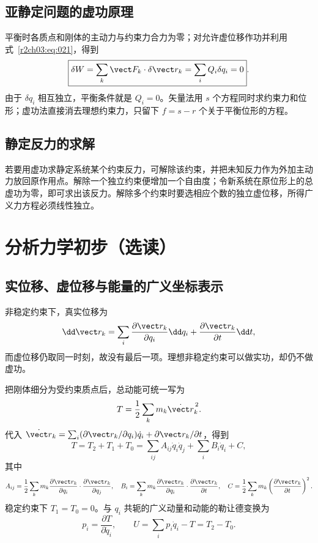 \subsection{亚静定问题的虚功原理}

平衡时各质点和刚体的主动力与约束力合力为零；对允许虚位移作功并利用式~\eqref{r2ch03:eq:021}，得到
\begin{equation}
 \boxed{\delta W=\sum_k\vect F_k\cdot\delta\vect r_k
 =\sum_iQ_i\delta q_i=0}.
 \label{r2ch03:eq:022}
\end{equation}
由于 $\delta q_i$ 相互独立，平衡条件就是 $Q_i=0$。矢量法用 $s$ 个方程同时求约束力和位形；虚功法直接消去理想约束力，只留下 $f=s-r$ 个关于平衡位形的方程。

\subsection{静定反力的求解}

若要用虚功求静定系统某个约束反力，可解除该约束，并把未知反力作为外加主动力放回原作用点。解除一个独立约束便增加一个自由度；令新系统在原位形上的总虚功为零，即可求出该反力。解除多个约束时要选相应个数的独立虚位移，所得广义力方程必须线性独立。

\section{分析力学初步（选读）}
\label{r2ch03:sec:lagrange}

\subsection{实位移、虚位移与能量的广义坐标表示}

非稳定约束下，真实位移为
\begin{equation}
 \dd\vect r_k=\sum_i\frac{\partial\vect r_k}{\partial q_i}\dd q_i
 +\frac{\partial\vect r_k}{\partial t}\dd t ,
 \label{r2ch03:eq:023}
\end{equation}
而虚位移仍取同一时刻，故没有最后一项。理想非稳定约束可以做实功，却仍不做虚功。

把刚体细分为受约束质点后，总动能可统一写为
\[
 T=\frac12\sum_km_k\dot{\vect r}_k^{\,2}.
\]
代入
$\dot{\vect r}_k=\sum_i(\partial\vect r_k/\partial q_i)\dot q_i+
\partial\vect r_k/\partial t$，得到
\begin{equation}
 T=T_2+T_1+T_0
 =\sum_{ij}A_{ij}\dot q_i\dot q_j+\sum_iB_i\dot q_i+C ,
 \label{r2ch03:eq:024}
\end{equation}
其中
\[
 A_{ij}=\frac12\sum_km_k
 \frac{\partial\vect r_k}{\partial q_i}\cdot
 \frac{\partial\vect r_k}{\partial q_j},\quad
 B_i=\sum_km_k\frac{\partial\vect r_k}{\partial q_i}\cdot
 \frac{\partial\vect r_k}{\partial t},\quad
 C=\frac12\sum_km_k\left(\frac{\partial\vect r_k}{\partial t}\right)^2 .
\]
稳定约束下 $T_1=T_0=0$。与 $q_i$ 共轭的广义动量和动能的勒让德变换为
\begin{equation}
 p_i=\frac{\partial T}{\partial\dot q_i},\qquad
 U=\sum_ip_i\dot q_i-T=T_2-T_0 .
 \label{r2ch03:eq:025}
\end{equation}

